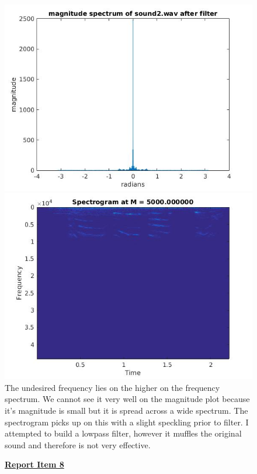 \documentclass{article}
\begin{document}
\begin{figure}[H]
\includegraphics[scale = .5]{report7_3}
\includegraphics[scale = .5]{report7_4}
\\ The undesired frequency lies on the higher on the frequency spectrum. We cannot see it very well on the magnitude plot because it's magnitude is small but it is spread across a wide spectrum.
The spectrogram picks up on this with a slight speckling prior to filter. I attempted to build a lowpass filter, however it muffles the original sound and therefore is not very effective. 
\end{figure}

\begin{figure}[H]
  \color{red}
  \underline{\textbf{Report Item 8}}
  \color{black}


\end{figure}
\end{document}
